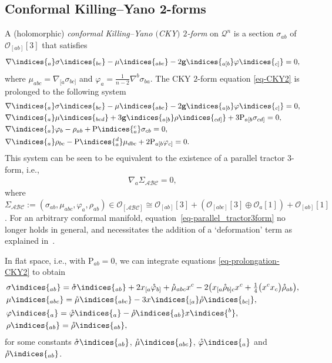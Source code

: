 \documentclass[pdftex]{sigma}
\numberwithin{equation}{section}
\newcommand{\mbf} [1]{\mathbf{#1}}
\newcommand{\mc} [1]{\mathcal{#1}}
\newcommand{\mr}[1] {\mathring{#1}}
\newcommand{\ind} {\indices}
\newcommand{\Rho} {\mathrm{P}}
\begin{document}
\subsection{Conformal Killing--Yano 2-forms}
A (holomorphic) \emph{conformal Killing--Yano $($CKY$)$ $2$-form} on $\mc{Q}^n$ is a section $\sigma_{ab}$ of $\mc{O}_{[ab]} [3]$ that satisf\/ies
\begin{gather}\label{eq-CKY2}
 \nabla \ind{_a} \sigma \ind{_{bc}} - \mu \ind{_{abc}} - 2 \mbf{g} \ind{_{a [b}} \varphi \ind{_{c]}} = 0 ,
\end{gather}
where $\mu_{abc} = \nabla_{[a} \sigma_{bc]}$ and $\varphi_a = \frac{1}{n-2} \nabla^b \sigma_{ba}$.
The CKY $2$-form equation \eqref{eq-CKY2} is prolonged to the following system
\begin{gather}\label{eq-prolongation-CKY2}
\begin{split}
& \nabla \ind{_a} \sigma \ind{_{bc}} - \mu \ind{_{abc}} - 2 \mbf{g} \ind{_{a [b}} \varphi \ind{_{c]}} = 0 , \\
& \nabla \ind{_a} \mu \ind{_{bcd}} + 3 \mbf{g} \ind{_{a [b}} \rho \ind{_{cd]}} + 3 \Rho_{a[b} \sigma_{cd]} = 0 , \\
& \nabla \ind{_a} \varphi_b - \rho_{ab} + \Rho \ind{_a^c} \sigma_{cb} = 0 , \\
& \nabla \ind{_a} \rho_{bc} - \Rho \ind{_a^d} \mu_{dbc} + 2 \Rho_{a[b} \varphi_{c]} = 0 .
 \end{split}
\end{gather}
This system can be seen to be equivalent to the existence of a parallel tractor $3$-form, i.e.,
\begin{gather}
\nabla_a \Sigma_{\mc{A} \mc{B} \mc{C}} = 0 , \label{eq-parallel_tractor3form}
\end{gather}
where $\Sigma_{\mc{A}\mc{B}\mc{C}} := ( \sigma_{ab} , \mu_{abc} , \varphi_a , \rho_{ab} ) \in \mc{O}_{[\mc{A}\mc{B}\mc{C}]} \cong \mc{O}_{[ab]}[3] + ( \mc{O}_{[abc]}[3] \oplus \mc{O}_{a}[1] ) + \mc{O}_{[ab]}[1]$. For an arbitrary conformal manifold, equation~\eqref{eq-parallel_tractor3form} no longer holds in general, and necessitates the addition of a `deformation' term as explained in~\cite{Gover2008}.

In f\/lat space, i.e., with $\Rho_{ab}=0$, we can integrate equations \eqref{eq-prolongation-CKY2} to obtain
\begin{gather}\label{eq-CKY-integrated}
\begin{split}
& \sigma \ind{_{a b}} = \mr{\sigma} \ind{_{a b}} + 2 x_{[a} \mr{\varphi}_{b]} + \mr{\mu}_{abc} x^c - 2 \big( x_{[a} \mr{\rho}_{b]c} x^c + \tfrac{1}{4} \big(x^c x_c\big) \mr{\rho}_{ab} \big) , \\
&\mu \ind{_{abc}} = \mr{\mu} \ind{_{abc}} - 3 x \ind{_{[a}} \mr{\rho} \ind{_{b c]}} , \\
& \varphi \ind{_a} = \mr{\varphi} \ind{_a} - \mr{\rho} \ind{_{a b}} x \ind{^b} , \\
& \rho \ind{_{a b}} = \mr{\rho} \ind{_{a b}} ,
 \end{split}
\end{gather}
for some constants $\mr{\sigma} \ind{_{a b}}$, $\mr{\mu} \ind{_{abc}}$, $\mr{\varphi} \ind{_a}$ and $\mr{\rho} \ind{_{a b}}$.
\end{document}
